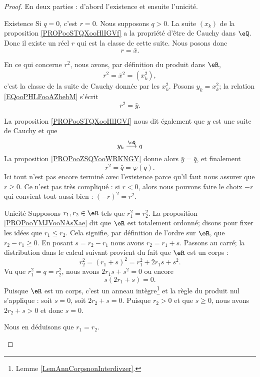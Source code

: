 \begin{proof}
	En deux parties : d'abord l'existence et ensuite l'unicité.
	\begin{subproof}
		\item[Existence]
		Si \( q=0\), c'est \( r=0\). Nous supposons \( q>0\). La suite \( (x_k)\) de la proposition \ref{PROPooSTQXooHlIGVf} a la propriété d'être de Cauchy dans \( \eQ\). Donc il existe un réel \( r\) qui est la classe de cette suite. Nous posons donc
		\begin{equation}
			r=\bar x.
		\end{equation}

		En ce qui concerne \( r^2\), nous avons, par définition du produit dans \( \eR\),
		\begin{equation}        \label{EQooPHLFooAZhebM}
			r^2=\bar x^2=\overline{ (x_k^2) },
		\end{equation}
		c'est la classe de la suite de Cauchy donnée par les \( x_k^2\). Posons \( y_k=x_k^2\); la relation \eqref{EQooPHLFooAZhebM} s'écrit
		\begin{equation}
			r^2=\bar y.
		\end{equation}

		La proposition \ref{PROPooSTQXooHlIGVf} nous dit également que \( y\) est une suite de Cauchy et que
		\begin{equation}
			y_k\stackrel{\eQ}{\longrightarrow}q
		\end{equation}
		La proposition \ref{PROPooZSQYooWRKNGY} donne alors \( \bar y=\bar q\), et finalement
		\begin{equation}
			r^2=\bar q=\varphi(q).
		\end{equation}
		Ici tout n'est pas encore terminé avec l'existence parce qu'il faut nous assurer que \( r\geq 0\). Ce n'est pas très compliqué : si \( r<0\), alors nous pouvons faire le choix \( -r\) qui convient tout aussi bien : \( (-r)^2=r^2\).
		\item[Unicité]
		Supposons \( r_1,r_2\in \eR\) tels que \( r_1^2=r_2^2\). La proposition \ref{PROPooYMJVooNAsXae} dit que \( \eR\) est totalement ordonné; disons pour fixer les idées que \( r_1\leq r_2\). Cela signifie, par définition de l'ordre sur \( \eR\), que \( r_2-r_1\geq 0\). En posant \( s=r_2-r_1\) nous avons \( r_2=r_1+s\). Passons au carré; la distribution dans le calcul suivant provient du fait que \( \eR\) est un corps :
		\begin{equation}
			r_2^2=(r_1+s)^2=r_1^2+2r_1s+s^2.
		\end{equation}
		Vu que \( r_1^2=q=r_2^2\), nous avons \( 2r_1s+s^2=0\) ou encore
		\begin{equation}
			s(2r_1+s)=0.
		\end{equation}
		Puisque \( \eR\) est un corps, c'est un anneau intègre\footnote{Lemme \ref{LemAnnCorpsnonInterdivzer}.} et la règle du produit nul s'applique : soit \( s=0\), soit \( 2r_2+s=0\). Puisque \( r_2>0\) et que \( s\geq 0\), nous avons \( 2r_2+s>0\) et donc \( s=0\).

		Nous en déduisons que \( r_1=r_2\).
	\end{subproof}
\end{proof}


